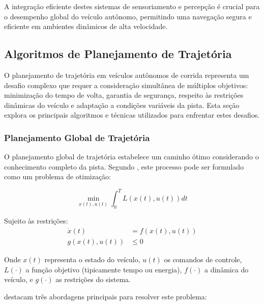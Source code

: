 A integração eficiente destes sistemas de sensoriamento e percepção é crucial
para o desempenho global do veículo autônomo, permitindo uma navegação segura e
eficiente em ambientes dinâmicos de alta velocidade.

\subsection{Algoritmos de Planejamento de Trajetória}

O planejamento de trajetória em veículos autônomos de corrida representa um
desafio complexo que requer a consideração simultânea de múltiplos objetivos:
minimização do tempo de volta, garantia de segurança, respeito às restrições
dinâmicas do veículo e adaptação a condições variáveis da pista. Esta seção
explora os principais algoritmos e técnicas utilizados para enfrentar estes
desafios.

\subsubsection{Planejamento Global de Trajetória}

O planejamento global de trajetória estabelece um caminho ótimo considerando o
conhecimento completo da pista. Segundo \cite{Karaman2011Optimal}, este
processo pode ser formulado como um problema de otimização:

\begin{equation}
    \min_{x(t), u(t)} \int_0^T L(x(t), u(t))dt
\end{equation}

Sujeito às restrições:
\begin{align}
    \dot{x}(t)    & = f(x(t), u(t)) \\
    g(x(t), u(t)) & \leq 0
\end{align}

Onde $x(t)$ representa o estado do veículo, $u(t)$ os comandos de controle,
$L(\cdot)$ a função objetivo (tipicamente tempo ou energia), $f(\cdot)$ a
dinâmica do veículo, e $g(\cdot)$ as restrições do sistema.

\cite{Wang2020LMPC} destacam três abordagens principais para resolver este problema:

